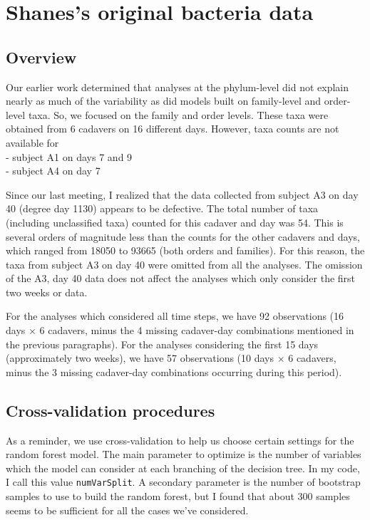 \documentclass{article}
\begin{document}
\section{Shanes's original bacteria data}

\subsection{Overview}

Our earlier work determined that analyses at the phylum-level did not
explain nearly as much of the variability as did models built on
family-level and order-level taxa.  So, we focused on the family and
order levels.  These taxa were obtained from 6 cadavers on 16 different
days.  However, taxa counts are not available for\\
- subject A1 on days 7 and 9\\
- subject A4 on day 7


Since our last meeting, I realized that the data collected from
subject A3 on day 40 (degree day 1130) appears to be defective.  The
total number of taxa (including unclassified taxa) counted for this
cadaver and day was 54.  This is several orders of magnitude less than
the counts for the other cadavers and days, which ranged from 18050 to
93665 (both orders and families).  For this reason, the taxa from
subject A3 on day 40 were omitted from all the analyses.  The omission
of the A3, day 40 data does not affect the analyses which only
consider the first two weeks or data.

For the analyses which considered all time steps, we have 92
observations (16 days $\times$ 6 cadavers, minus the 4 missing
cadaver-day combinations mentioned in the previous paragraphs).  For
the analyses considering the first 15 days (approximately two weeks),
we have 57 observations (10 days $\times$ 6 cadavers, minus the 3
missing cadaver-day combinations occurring during this period).


\subsection{Cross-validation procedures}

As a reminder, we use cross-validation to help us choose certain
settings for the random forest model.  The main parameter to optimize
is the number of variables which the model can consider at each
branching of the decision tree.  In my code, I call this value
\texttt{numVarSplit}.  A secondary parameter is the number of bootstrap
samples to use to build the random forest, but I found that about 300
samples seems to be sufficient for all the cases we've considered.
\end{document}
